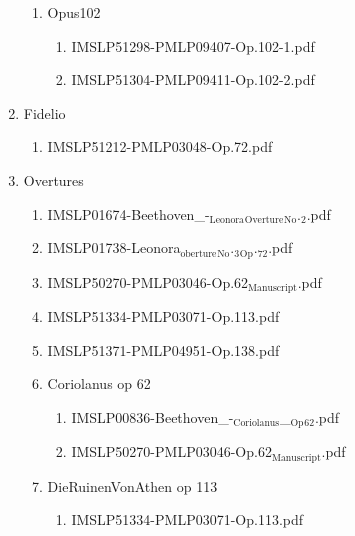\documentclass[11pt]{article}
\begin{document}
\begin{enumerate}
\begin{enumerate}
\item Opus102
\label{sec-1-1-1-1-44-9-1-5}
\begin{enumerate}
\item IMSLP51298-PMLP09407-Op.102-1.pdf
\label{sec-1-1-1-1-44-9-1-5-1}

\item IMSLP51304-PMLP09411-Op.102-2.pdf
\label{sec-1-1-1-1-44-9-1-5-2}
\end{enumerate}
\end{enumerate}

\item Fidelio
\label{sec-1-1-1-1-44-9-2}
\begin{enumerate}
\item IMSLP51212-PMLP03048-Op.72.pdf
\label{sec-1-1-1-1-44-9-2-1}
\end{enumerate}

\item Overtures
\label{sec-1-1-1-1-44-9-3}
\begin{enumerate}
\item IMSLP01674-Beethoven\_-$_{\text{Leonora}}$$_{\text{Overture}}$$_{\text{No}}$.$_{\text{2}}$.pdf
\label{sec-1-1-1-1-44-9-3-1}

\item IMSLP01738-Leonora$_{\text{oberture}}$$_{\text{No}}$.$_{\text{3}}$$_{\text{Op}}$.$_{\text{72}}$.pdf
\label{sec-1-1-1-1-44-9-3-2}

\item IMSLP50270-PMLP03046-Op.62$_{\text{Manuscript}}$.pdf
\label{sec-1-1-1-1-44-9-3-3}

\item IMSLP51334-PMLP03071-Op.113.pdf
\label{sec-1-1-1-1-44-9-3-4}

\item IMSLP51371-PMLP04951-Op.138.pdf
\label{sec-1-1-1-1-44-9-3-5}

\item Coriolanus op 62
\label{sec-1-1-1-1-44-9-3-6}
\begin{enumerate}
\item IMSLP00836-Beethoven\_-$_{\text{Coriolanus}}$\_$_{\text{Op}}$$_{\text{62}}$.pdf
\label{sec-1-1-1-1-44-9-3-6-1}

\item IMSLP50270-PMLP03046-Op.62$_{\text{Manuscript}}$.pdf
\label{sec-1-1-1-1-44-9-3-6-2}
\end{enumerate}

\item DieRuinenVonAthen op 113
\label{sec-1-1-1-1-44-9-3-7}
\begin{enumerate}
\item IMSLP51334-PMLP03071-Op.113.pdf
\label{sec-1-1-1-1-44-9-3-7-1}
\end{enumerate}


\end{enumerate}
\end{enumerate}
\end{document}
